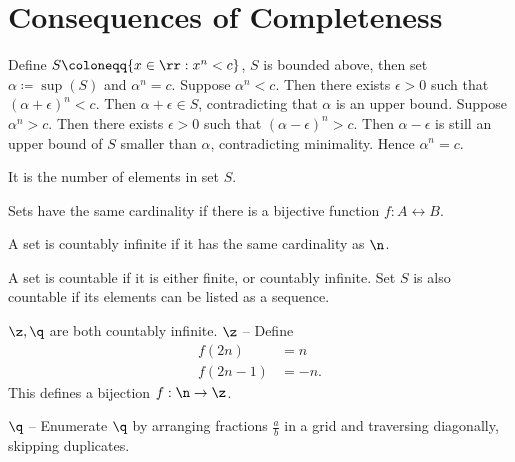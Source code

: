 
\section{Consequences of Completeness}


\begin{theorem}{
    Define $S\coloneqq\{x\in\rr : x^n < c\}$, $S$ is bounded above, then set $\alpha \coloneqq \sup(S)$ and $\alpha^n = c$.
}
    Suppose $\alpha^n < c$.
    Then there exists $\epsilon > 0$ such that $(\alpha + \epsilon)^n < c$.
    Then $\alpha + \epsilon \in S$, contradicting that $\alpha$ is an upper bound.
    Suppose $\alpha^n > c$.
    Then there exists $\epsilon > 0$ such that $(\alpha - \epsilon)^n > c$.
    Then $\alpha - \epsilon$ is still an upper bound of $S$ smaller than $\alpha$, contradicting minimality.
    Hence $\alpha^n = c$.
\end{theorem}

\begin{definition}
    It is the number of elements in set $S$.
\end{definition}

\begin{definition}
    Sets have the same cardinality if there is a bijective function $f: A\leftrightarrow B$.
\end{definition}

\begin{definition}
    A set is countably infinite if it has the same cardinality as $\n$.
\end{definition}

\begin{definition}[Countable]
    A set is countable if it is either finite, or countably infinite.
    Set $S$ is also countable if its elements can be listed as a sequence.
\end{definition}

\begin{theorem}{
    $\z,\q$ are both countably infinite.
}
    $\z$ -- Define
    \begin{align*}
        f(2n) &= n\\
        f(2n-1) &= -n.
    \end{align*}
    This defines a bijection $f:\n\to\z$.

    $\q$ -- Enumerate $\q$ by arranging fractions $\frac{a}{b}$ in a grid and traversing diagonally, skipping duplicates.
\end{theorem}

